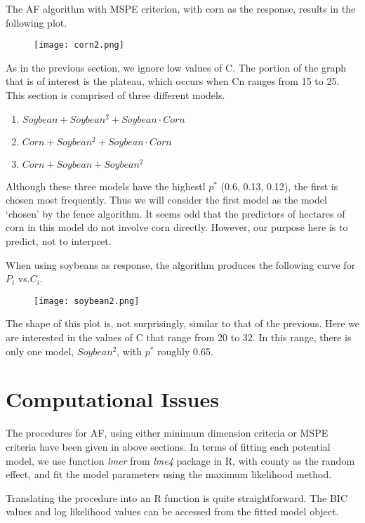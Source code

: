 \documentclass[11pt,letter]{article}
\begin{document}
The AF algorithm with MSPE criterion, with corn as the response, results in the following plot.

\begin{figure}[H]
  \centering
  \texttt{[image: corn2.png]}
\end{figure}

As in the previous section, we ignore low values of C.  The portion of the graph that is of interest is the plateau, which occurs when Cn ranges from 15 to 25.  This section is comprised of three different models.
\begin{enumerate}
\item $Soybean + Soybean^2 + Soybean\cdot Corn$  
\item $Corn + Soybean^2 + Soybean\cdot Corn $
\item $Corn + Soybean + Soybean^2$
\end{enumerate}

Although these three models have the highestl $p^*$ (0.6, 0.13, 0.12), the first is chosen most frequently.  Thus we will consider the first model as the model ‘chosen’ by the fence algorithm.  It seems odd that the predictors of hectares of corn in this model do not involve corn directly.  However, our purpose here is to predict, not to interpret. 

When using soybeans as response, the algorithm produces the following curve for $P_i$ vs.$ C_i$.

\begin{figure}[H]
  \centering
  \texttt{[image: soybean2.png]}
\end{figure}

The shape of this plot is, not surprisingly, similar to that of the previous.  Here we are interested in the values of C that range from 20 to 32.  In this range, there is only one model, $Soybean^2$, with $p^*$ roughly 0.65. 

\section{Computational Issues}
The procedures for AF, using either minimum dimension criteria or MSPE criteria have been given in above sections. In terms of fitting each potential model, we use function \textit{lmer} from \textit{lme4} package in R, with county as the random effect, and fit the model parameters using the maximum likelihood method. 

Translating the procedure into an R function is quite straightforward.  The BIC values and log likelihood values can be accessed from the fitted model object. 
\end{document}
